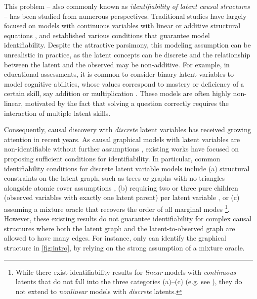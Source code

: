 \documentclass[10pt]{article} %
\begin{document}
%


%

This problem -- also commonly known as \emph{identifiability of latent causal structures} -- has been studied from numerous perspectives. Traditional studies have largely focused on models with continuous variables with linear or additive structural equations \citep{silva2006learning,anandkumar2013learning,huang2022latent,xie2022identification,xie2024generalized,montagna2023causal,montagna2025demystifying,moran2025towards}, and established various conditions that guarantee model identifiability. 
%
Despite the attractive parsimony, this modeling assumption can be unrealistic in practice, as the latent concepts can be discrete and the relationship between the latent and the observed may be non-additive. For example, in educational assessments, it is common to consider binary latent variables to model cognitive abilities, whose values correspond to mastery or deficiency of a certain skill, say addition or multiplication \citep{junker2001dina, von2008general}. These models are often highly non-linear, motivated by the fact that solving a question correctly requires the interaction of multiple latent skills.

Consequently, causal discovery with \emph{discrete} latent variables has received growing attention in recent years. As causal graphical models with latent variables are non-identifiable without further assumptions \citep{spirtes2001causation}, existing works have focused on proposing sufficient conditions for identifiability. In particular, {common identifiability conditions for discrete latent variable models} include (a) structural constraints on the latent graph, such as trees \citep{pearl1986structuring, song2014nonparametric,wang2017spectral} or graphs with no triangles alongside atomic cover assumptions \citep{kong2024learning},
(b) requiring two or three pure children (observed variables with exactly one latent parent) per latent variable \citep{gu2023bayesian,chen2024learning,chen2025identification,lee2025deep},
or (c) assuming a mixture oracle that recovers the order of all marginal modes \citep{kivva2021learning}\footnote{{While there exist identifiability results for \textit{linear} models with \textit{continuous} latents that do not fall into the three categories (a)--(c) (e.g. see \cite{anandkumar2013learning,adams2021identification,li2025recovery}), they do not extend to \textit{nonlinear} models with \textit{discrete} latents}.}. However, these existing results do not guarantee identifiability for complex causal structures where both the latent graph and the latent-to-observed graph are allowed to have many edges. For instance, only \cite{kivva2021learning} can identify the graphical structure in \cref{fig:intro}, by relying on the strong assumption of a mixture oracle.
\end{document}
